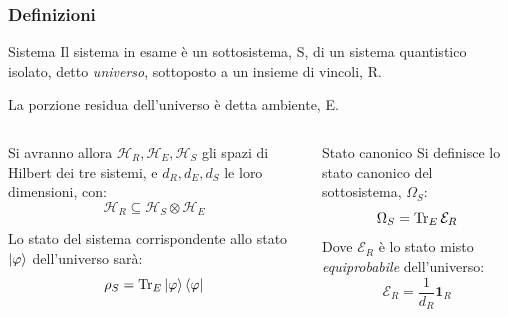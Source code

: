 \documentclass[10pt]{beamer}
\theoremstyle{definition}
\theoremstyle{plain}
\begin{document}
\begin{frame}
	\transpush[direction = 180]
	\frametitle{Definizioni}
	
	\begin{block}{Sistema}
		Il sistema in esame è un sottosistema, S, di un sistema quantistico isolato, detto \textit{universo}, sottoposto a un insieme di vincoli, R.
		
		La porzione residua dell'universo è detta ambiente, E.
	\end{block}
	\begin{columns}
		\begin{column}{0.5\textwidth}
			Si avranno allora $\mathcal{H}_R, \mathcal{H}_E, \mathcal{H}_S$ gli spazi di Hilbert dei tre sistemi, e $d_R, d_E, d_S$ le loro dimensioni, con:
			\begin{equation*}
			\mathcal{H}_R \subseteq \mathcal{H}_S \otimes \mathcal{H}_E
			\end{equation*}
			
			Lo stato del sistema corrispondente allo stato $\ket{\varphi}$ dell'universo sarà:
			\begin{equation*}
			\rho_S = \Tr_E \ket{\varphi}\bra{\varphi}
			\end{equation*}
		\end{column}
		\begin{column}{0.5\textwidth}
			\begin{block}{Stato canonico}
				Si definisce lo stato canonico del sottosistema, $\Omega_S$:
				\begin{equation*}
				\Omega_S = \Tr_E \mathcal{E}_R
				\end{equation*}
				Dove $\mathcal{E}_R$ è lo stato misto \textit{equiprobabile} dell'universo:
				\begin{equation*}
				\mathcal{E}_R = \frac{1}{d_R} \mathbf{1}_R
				\end{equation*}
			\end{block}
		\end{column}
	\end{columns}
	
\end{frame}
\end{document}
